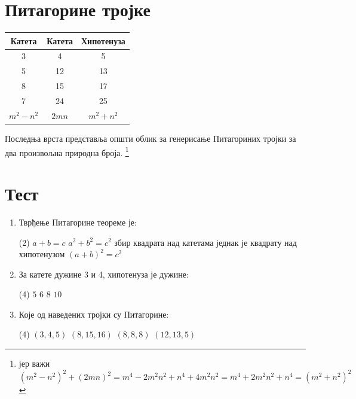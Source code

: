 \documentclass[11pt,a4paper]{article}
\begin{document}
\vspace{0.5cm}



\section*{Питагорине тројке} 

\begin{center} 
\renewcommand{\arraystretch}{1.4} 

\begin{tabular}{|c|c|c|} 
\hline \textbf{Катета} & \textbf{Катета} & \textbf{Хипотенуза} \\ 
\hline 3 & 4 & 5 \\ 
\hline 5 & 12 & 13 \\ 
\hline 8 & 15 & 17 \\ 
\hline 7 & 24 & 25 \\ 
\hline $m^2-n^2$ & $2mn$ & $m^2+n^2$ \\
\hline \end{tabular} \end{center} 

Последња врста представља општи облик за генерисање Питагориних тројки за два произвољна природна броја.
\footnote{јер важи $(m^2 - n^2)^2 + (2mn)^2 = m^4 - 2m^2n^2 + n^4 + 4m^2n^2 = m^4 + 2m^2n^2 + n^4 = (m^2 + n^2)^2$}

\section*{Тест}

\begin{enumerate}[label=\arabic*.]

\item Тврђење Питагорине теореме је:
\begin{tasks}(2)
\task $a+b=c$
\task $a^2+b^2=c^2$
\task збир квадрата над катетама једнак је квадрату над хипотенузом
\task $(a  + b)^2=c^2$
\end{tasks}

\item За катете дужине 3 и 4, хипотенуза је дужине:
\begin{tasks}(4)
\task $5$
\task $6$
\task $8$
\task $10$
\end{tasks}

\item Које од наведених тројки су Питагорине:
\begin{tasks}(4)
\task $(3, 4, 5)$
\task $(8, 15, 16)$
\task $(8, 8, 8)$
\task $(12, 13, 5)$
\end{tasks}

\end{enumerate}
\end{document}
